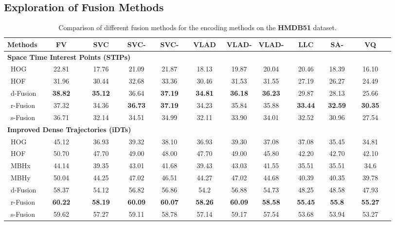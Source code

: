 \documentclass[twocolumn]{svjour3}          \smartqed  \usepackage{slashbox}
\begin{document}
\subsection{Exploration of Fusion Methods}
\begin{table*}
  \caption{Comparison of different fusion methods for the encoding methods on the \textbf{HMDB51} dataset.}
  \label{tbl:hmdb}
  \centering
  \begin{tabular}{lcccccccccc}
  \hline
  \hline
  Methods & ~~~FV~~~ & ~~SVC~~ & ~SVC-~ & ~SVC-~ & ~VLAD~ & VLAD- & VLAD- & ~~LLC~~ & SA- & ~~~VQ~~~ \\
  \hline
  \hline
  \multicolumn{11}{l}{\textbf{Space Time Interest Points (STIPs)}} \\
  ~HOG & 22.81 & 17.76 & 21.09 & 21.87 & 18.13 & 19.87 & 20.04 & 20.46 & 18.39 & 16.10 \\
  ~HOF & 31.96 & 30.44 & 32.68 & 33.36 & 30.46 & 31.53 & 31.55 & 27.19 & 26.27 & 24.49\\
  ~d-Fusion & \textbf{38.82} & \textbf{35.12} & 36.64 & \textbf{37.19} & \textbf{34.81} & \textbf{36.18} & \textbf{36.23} & 29.87 & 28.13 & 25.66 \\
  ~r-Fusion & 37.32 & 34.36 & \textbf{36.73} & \textbf{37.19} & 34.23 & 35.84 & 35.88 & \textbf{33.44} & \textbf{32.59} & \textbf{30.35} \\
  ~s-Fusion & 36.71 & 32.14 & 34.51 & 34.99 & 32.11 & 33.90 & 34.01 & 32.52 & 30.96 & 27.54 \\
  \hline
  \multicolumn{11}{l}{\textbf{Improved Dense Trajectories (iDTs)}} \\
  ~HOG & 45.12 & 36.93 & 39.32 & 38.10 & 36.93 & 39.30 & 37.08 & 37.08 & 35.45 & 34.81 \\
  ~HOF & 50.70 & 47.70 & 49.00 & 48.00 & 47.70 & 49.00 & 45.80 & 42.20 & 42.70 & 42.10 \\
  ~MBHx & 44.14 & 39.35 & 43.01 & 41.68 & 39.43 & 43.03 & 41.55 & 35.51 & 35.51 & 34.6 \\
  ~MBHy & 50.04 & 44.25 & 47.02 & 46.51 & 44.27 & 47.02 & 44.68 & 40.39 & 40.35 & 39.78 \\
  ~d-Fusion & 58.37 & 54.12 & 56.82 & 56.86 & 54.2 & 56.88 & 54.73 & 48.25 & 48.58 & 47.93 \\
  ~r-Fusion & \textbf{60.22} & \textbf{58.19} & \textbf{60.09} & \textbf{60.07} & \textbf{58.26} & \textbf{60.09} & \textbf{58.58} & \textbf{55.45} & \textbf{55.8} & \textbf{55.27} \\
  ~s-Fusion &  59.62 & 57.27 & 59.11 & 58.78 & 57.14 & 59.17 &  57.54 & 53.68 & 53.94 & 53.27 \\
  \hline
  \hline
  \end{tabular}
\end{table*}
\end{document}
